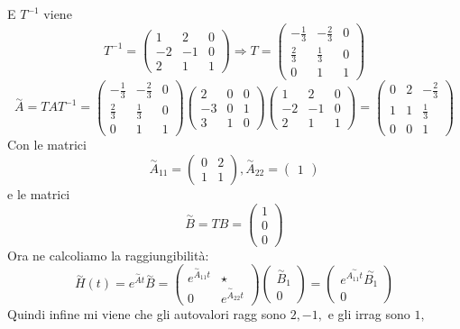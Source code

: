 \documentclass{article}
\begin{document}
E $T^{-1}$ viene \[ T^{-1} = \left(\begin{matrix}1 & 2 & 0\\-2 & -1 & 0\\2 & 1 & 1\end{matrix}\right) \Longrightarrow T = \left(\begin{matrix}- \frac{1}{3} & - \frac{2}{3} & 0\\\frac{2}{3} & \frac{1}{3} & 0\\0 & 1 & 1\end{matrix}\right) \]
\[ \overset{\sim}{A} = T A  T^{-1} = \left(\begin{matrix}- \frac{1}{3} & - \frac{2}{3} & 0\\\frac{2}{3} & \frac{1}{3} & 0\\0 & 1 & 1\end{matrix}\right)\left(\begin{matrix}2 & 0 & 0\\-3 & 0 & 1\\3 & 1 & 0\end{matrix}\right)\left(\begin{matrix}1 & 2 & 0\\-2 & -1 & 0\\2 & 1 & 1\end{matrix}\right) = \left(\begin{matrix}0 & 2 & - \frac{2}{3}\\1 & 1 & \frac{1}{3}\\0 & 0 & 1\end{matrix}\right) \]Con le matrici \[ \overset{\sim}{A}_{11} = \left(\begin{matrix}0 & 2\\1 & 1\end{matrix}\right) , \overset{\sim}{A}_{22} = \left(\begin{matrix}1\end{matrix}\right)  \]e le matrici \[ \overset{\sim}{B} = TB = \left(\begin{matrix}1\\0\\0\end{matrix}\right)  \]
Ora ne calcoliamo la raggiungibilità: \[ \overset{\sim}{H}(t) = e^{\overset{\sim}{A}t}\overset{\sim}{B} = \begin{pmatrix} e^{\overset{\sim}{A}_{11}t} &  \star \\ 0 & e^{\overset{\sim}{A}_{22}t} \end{pmatrix} \begin{pmatrix} \overset{\sim}{B}_1 \\ 0 \end{pmatrix} = \begin{pmatrix} e^{\overset{\sim}{A_{11}t}}\overset{\sim}{B_1} \\ 0 \end{pmatrix} \]
Quindi infine mi viene che gli autovalori ragg sono $ 2, -1,  $ e gli irrag sono $ 1,  $
\end{document}
